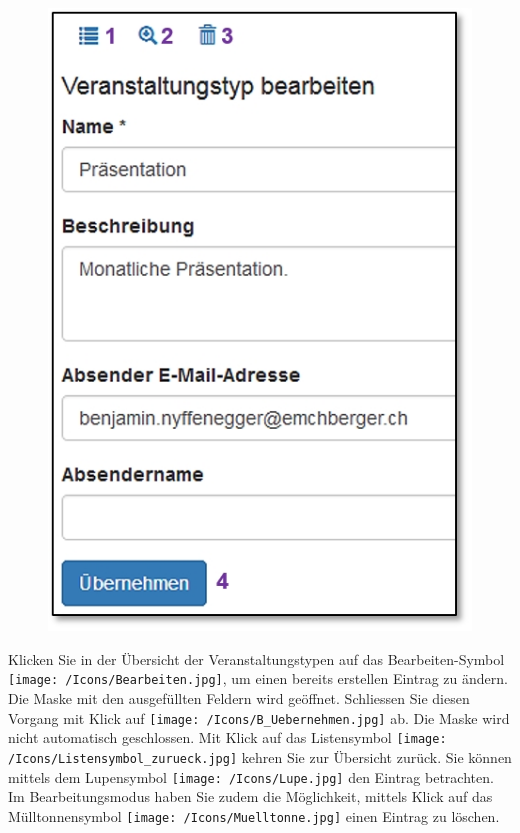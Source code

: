\begin{figure}   %
  \vspace{-35pt}      %
  \begin{center}
    \includegraphics[width=1\linewidth]{../chapters/10_CRM/pictures/10-1-2_Veranstaltungstyp_bearbeiten.jpg}
  \end{center}
  \vspace{-20pt}
  \vspace{-10pt}
\end{figure}

Klicken Sie in der Übersicht der Veranstaltungstypen auf das Bearbeiten-Symbol \texttt{[image: /Icons/Bearbeiten.jpg]}, um einen bereits erstellen Eintrag zu ändern. Die Maske mit den ausgefüllten Feldern wird geöffnet. Schliessen Sie diesen Vorgang mit Klick auf \texttt{[image: /Icons/B\_Uebernehmen.jpg]}  ab. Die Maske wird nicht automatisch geschlossen. Mit Klick auf das Listensymbol \texttt{[image: /Icons/Listensymbol\_zurueck.jpg]}  kehren Sie zur Übersicht zurück. Sie können mittels dem Lupensymbol \texttt{[image: /Icons/Lupe.jpg]}  den Eintrag betrachten. Im Bearbeitungsmodus haben Sie zudem die Möglichkeit, mittels Klick auf das Mülltonnensymbol \texttt{[image: /Icons/Muelltonne.jpg]}  einen Eintrag zu löschen.

